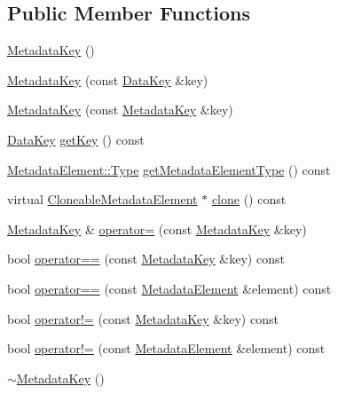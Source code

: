 \subsection*{Public Member Functions}
\begin{DoxyCompactItemize}
\item 
\hyperlink{classBUSBOY_1_1MetadataKey_a491339dfe8773ab3a9942bae3c516dac}{MetadataKey} ()
\item 
\hyperlink{classBUSBOY_1_1MetadataKey_afaf2aa6f3f1a47f7fe43852339cb91f6}{MetadataKey} (const \hyperlink{classBUSBOY_1_1DataKey}{DataKey} \&key)
\item 
\hyperlink{classBUSBOY_1_1MetadataKey_ad18d178f6c106d20f6ba9dfd8377ebe9}{MetadataKey} (const \hyperlink{classBUSBOY_1_1MetadataKey}{MetadataKey} \&key)
\item 
\hyperlink{classBUSBOY_1_1DataKey}{DataKey} \hyperlink{classBUSBOY_1_1MetadataKey_a39ec4c0784cac06b78a48011dfcdb23b}{getKey} () const 
\item 
\hyperlink{classBUSBOY_1_1MetadataElement_ab66bf575c7d26f857a2871d42bd97d12}{MetadataElement::Type} \hyperlink{classBUSBOY_1_1MetadataKey_a1e61e743e965046f08839d820f2d8320}{getMetadataElementType} () const 
\item 
virtual \hyperlink{classBUSBOY_1_1CloneableMetadataElement}{CloneableMetadataElement} $\ast$ \hyperlink{classBUSBOY_1_1MetadataKey_a6b3f94f3bc74ee43507c3c35362044dd}{clone} () const 
\item 
\hyperlink{classBUSBOY_1_1MetadataKey}{MetadataKey} \& \hyperlink{classBUSBOY_1_1MetadataKey_a18dd60f986c1726dd29cd1885a749c1a}{operator=} (const \hyperlink{classBUSBOY_1_1MetadataKey}{MetadataKey} \&key)
\item 
bool \hyperlink{classBUSBOY_1_1MetadataKey_afc2527147e8aacc0368eaeb67ae8d1dc}{operator==} (const \hyperlink{classBUSBOY_1_1MetadataKey}{MetadataKey} \&key) const 
\item 
bool \hyperlink{classBUSBOY_1_1MetadataKey_a62aec68af806b11282897d3d37efb8c9}{operator==} (const \hyperlink{classBUSBOY_1_1MetadataElement}{MetadataElement} \&element) const 
\item 
bool \hyperlink{classBUSBOY_1_1MetadataKey_aa87f34cefe429a511ee280c29a9de761}{operator!=} (const \hyperlink{classBUSBOY_1_1MetadataKey}{MetadataKey} \&key) const 
\item 
bool \hyperlink{classBUSBOY_1_1MetadataKey_afc2a154f70d75e71fd315ab53418fe23}{operator!=} (const \hyperlink{classBUSBOY_1_1MetadataElement}{MetadataElement} \&element) const 
\item 
\hyperlink{classBUSBOY_1_1MetadataKey_ab3d96536683deec947ea0bb222aec1f1}{$\sim$MetadataKey} ()
\end{DoxyCompactItemize}
